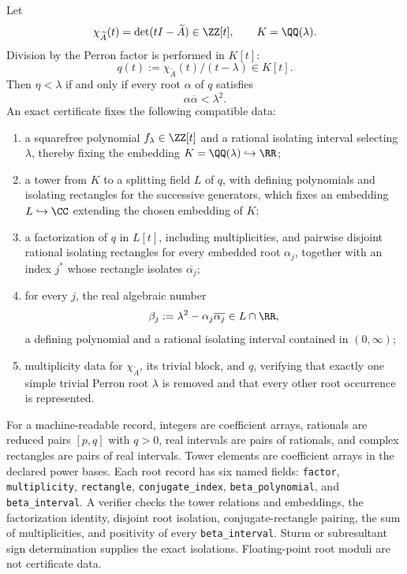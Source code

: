 \begin{proposition}
\label{prop:exact-gap-certificate}
Let
\[
  \chi_{\widetilde A}(t)=\det(tI-\widetilde A)\in\ZZ[t],
  \qquad K=\QQ(\lambda).
\]
Division by the Perron factor is performed in \(K[t]\):
\begin{equation}\label{eq:gap-division-field}
  q(t):=\chi_{\widetilde A}(t)/(t-\lambda)\in K[t].
\end{equation}
Then \(\eta<\lambda\) if and only if every root \(\alpha\) of \(q\) satisfies
\begin{equation}\label{eq:exact-root-comparison}
  \alpha\overline\alpha<\lambda^2.
\end{equation}
An exact certificate fixes the following compatible data:
\begin{enumerate}[label=\textup{(\roman*)},leftmargin=*]
  \item a squarefree polynomial \(f_\lambda\in\ZZ[t]\) and a rational
    isolating interval selecting \(\lambda\), thereby fixing the embedding
    \(K=\QQ(\lambda)\hookrightarrow\RR\);
  \item a tower from \(K\) to a splitting field \(L\) of \(q\), with defining
    polynomials and isolating rectangles for the successive generators, which
    fixes an embedding \(L\hookrightarrow\CC\) extending the chosen embedding
    of \(K\);
  \item a factorization of \(q\) in \(L[t]\), including multiplicities, and
    pairwise disjoint rational isolating rectangles for every embedded root
    \(\alpha_j\), together with an index \(j^*\) whose rectangle isolates
    \(\overline{\alpha_j}\);
  \item for every \(j\), the real algebraic number
    \[
      \beta_j:=\lambda^2-\alpha_j\overline{\alpha_j}\in L\cap\RR,
    \]
    a defining polynomial and a rational isolating interval contained in
    \((0,\infty)\);
  \item multiplicity data for \(\chi_{\widetilde A}\), its trivial block, and
    \(q\), verifying that exactly one simple trivial Perron root \(\lambda\)
    is removed and that every other root occurrence is represented.
\end{enumerate}
For a machine-readable record, integers are coefficient arrays, rationals are
reduced pairs \([p,q]\) with \(q>0\), real intervals are pairs of rationals,
and complex rectangles are pairs of real intervals.  Tower elements are
coefficient arrays in the declared power bases.  Each root record has six
named fields: \texttt{factor}, \texttt{multiplicity}, \texttt{rectangle},
\texttt{conjugate\_index}, \texttt{beta\_polynomial}, and
\texttt{beta\_interval}.
A verifier checks the tower relations and embeddings, the factorization
identity, disjoint root isolation, conjugate-rectangle pairing, the sum of
multiplicities, and positivity of every \texttt{beta\_interval}.  Sturm or
subresultant sign determination supplies the exact isolations.  Floating-point
root moduli are not certificate data.
\end{proposition}

